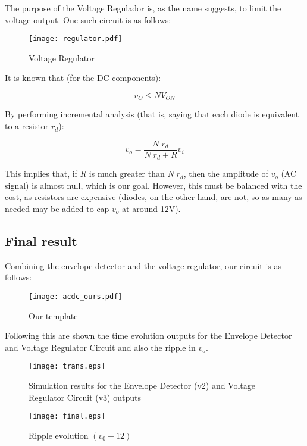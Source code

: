 The purpose of the Voltage Regulador is, as the name suggests, to limit the voltage output. One such circuit is as follows:

\begin{figure}[H]
        \centering
        \texttt{[image: regulator.pdf]}
        \caption{Voltage Regulator}
        \label{envelope}
\end{figure}

It is known that (for the DC components):

\begin{equation}
        v_O \leq N V_{ON}
        \label{max}
\end{equation}

By performing incremental analysis (that is, saying that each diode is equivalent to a resistor $r_d$):

\begin{equation}
        v_o = \frac{N\;r_d}{N\;r_d + R} v_i
        \label{vo}
\end{equation}

This implies that, if $R$ is much greater than $N\;r_d$, then the amplitude of $v_o$ (AC signal) is almost null, which is our goal. However, this must be balanced with the cost, as resistors are expensive (diodes, on the other hand, are not, so as many as needed may be added to cap $v_o$ at around 12V).

\subsection{Final result}

Combining the envelope detector and the voltage regulator, our circuit is as follows:

\begin{figure}[H]
        \centering
        \texttt{[image: acdc\_ours.pdf]}
        \caption{Our template}
        \label{acdc_ours}
\end{figure}


Following this are shown the time evolution outputs for the Envelope Detector and Voltage Regulator Circuit and also the ripple in $v_o$. 

\begin{figure}[H]
        \centering
        \texttt{[image: trans.eps]}
        \caption{Simulation results for the Envelope Detector (v2) and Voltage Regulator Circuit (v3) outputs}
        \label{sim_res}
\end{figure}

\begin{figure}[H]
        \centering
        \texttt{[image: final.eps]}
        \caption{Ripple evolution $(v_0-12)$}
        \label{sim_ripple_res}
\end{figure}
